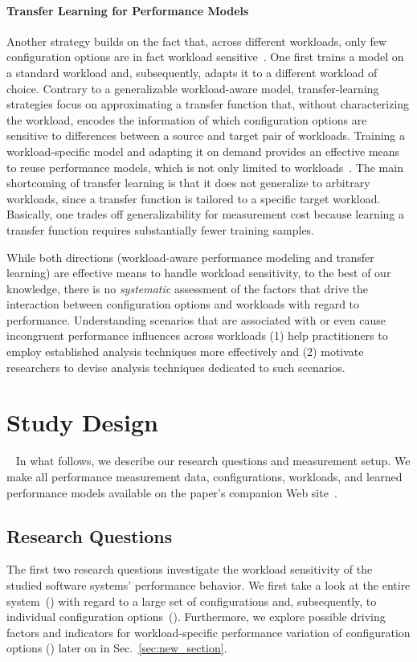 {\paragraph{Transfer Learning for Performance Models}\label{sec:transfer}
Another strategy builds on the fact that, across different workloads, only few configuration options are in fact workload sensitive~\cite{jamishidi_transfer_2017}. One first trains a model on a standard workload and, subsequently, adapts it to a different workload of choice. Contrary to a generalizable workload-aware model, transfer-learning strategies focus on approximating a transfer function that, without characterizing the workload, encodes the information of which configuration options are sensitive to differences between a source and target pair of workloads. Training a workload-specific model and adapting it on demand provides an effective means to reuse performance models, which is not only limited to workloads~\cite{jamshidi_learning_2018, ding_bayesian_2020,valov_transferring_performance_2017,martin_transfer_2021}. The main shortcoming of transfer learning is that it does not generalize to arbitrary workloads, since a transfer function is tailored to a specific target workload. Basically, one trades off generalizability for measurement cost because learning a transfer function requires substantially fewer training samples.

While both directions (workload-aware performance modeling and transfer learning) are effective means to handle workload sensitivity, to the best of our knowledge, there is no \textit{systematic} assessment of the factors that drive the interaction between configuration options and workloads with regard to performance. Understanding scenarios that are associated with or even cause incongruent performance influences across workloads (1) help practitioners to employ established analysis techniques more effectively and (2) motivate researchers to devise analysis techniques dedicated to such scenarios.

\section{Study Design}~\label{sec:study}
In what follows, we describe our research questions and measurement setup. We make all performance measurement data, configurations, workloads, and learned performance models available on the paper's companion Web site~\cite{muhlbauer_workload_2023_companion}.

\subsection{Research Questions}
The first two research questions investigate the workload sensitivity of the studied software systems' performance behavior. We first take a look at the entire system~() with regard to a large set of configurations and, subsequently, to individual configuration options~(). Furthermore, we explore possible driving factors and indicators for workload-specific performance variation of configuration options () {\color{brown} later on in Sec.~\ref{sec:new_section}}.

}
